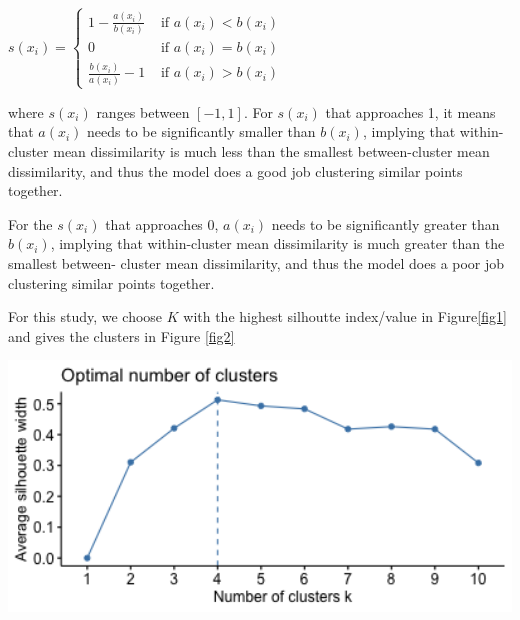 \documentclass[11pt,preprint, authoryear]{elsarticle}
\let\origfigure\figure
\let\endorigfigure\endfigure
\renewenvironment{figure}[1][2] {
    \expandafter\origfigure\expandafter[H]
} {
    \endorigfigure
}
\numberwithin{equation}{section}
\numberwithin{figure}{section}
\numberwithin{table}{section}
\begin{document}
\(s\left(x_i\right)= \begin{cases}1-\frac{a\left(x_i\right)}{b\left(x_i\right)} & \text { if } a\left(x_i\right)<b\left(x_i\right) \\ 0 & \text { if } a\left(x_i\right)=b\left(x_i\right) \\ \frac{b\left(x_i\right)}{a\left(x_i\right)}-1 & \text { if } a\left(x_i\right)>b\left(x_i\right)\end{cases}\)

where \(s(x_i)\) ranges between \([-1, 1]\). For \(s(x_i)\) that
approaches 1, it means that \(a(x_i)\) needs to be significantly smaller
than \(b(x_i)\), implying that within-cluster mean dissimilarity is much
less than the smallest between-cluster mean dissimilarity, and thus the
model does a good job clustering similar points together.

For the \(s(x_i)\) that approaches 0, \(a(x_i)\) needs to be
significantly greater than \(b(x_i)\), implying that within-cluster mean
dissimilarity is much greater than the smallest between- cluster mean
dissimilarity, and thus the model does a poor job clustering similar
points together.

For this study, we choose \(K\) with the highest silhoutte index/value
in Figure\ref{fig1} and gives the clusters in Figure \ref{fig2}

\begin{figure}[H]

\includegraphics[width=5.56in]{images/silhouette} \hfill{}

\caption{ Silhoutte Indexes for Clusters \label{fig1}}\label{fig:unnamed-chunk-1}
\end{figure}
\end{document}
